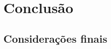 \documentclass[
	12pt,				%
	openright,			%
	twoside,			%
	a4paper,			%
	english,			%
	brazil				%
	]{abntex2}
\begin{document}
\part{Conclusão}

\chapter*[Considerações finais]{Considerações finais}

\lipsum[31-33]

\postextual



%
%




\end{document}

